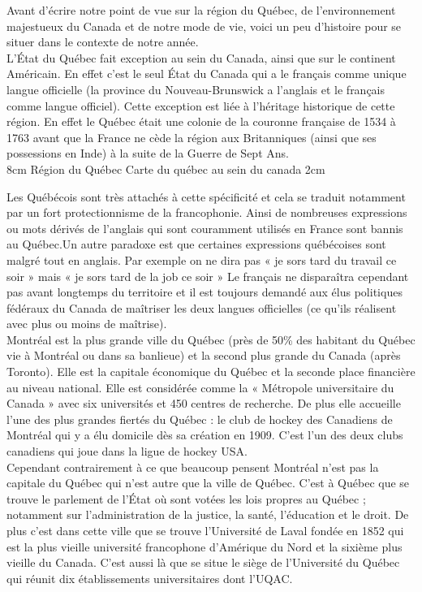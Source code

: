 Avant d'écrire notre point de vue sur la région du Québec, de l'environnement majestueux du Canada et de notre mode de vie, voici un peu d'histoire pour se situer dans le contexte de notre année.\\

L’État du Québec fait exception au sein du Canada, ainsi que sur le continent Américain. En effet c’est le seul État du Canada qui a le français comme unique langue officielle (la province du Nouveau-Brunswick a l’anglais et le français comme langue officiel). Cette exception est liée à l’héritage historique de cette région. En effet le Québec était une colonie de la couronne française de 1534 à 1763 avant que la France ne cède la région aux Britanniques (ainsi que ses possessions en Inde) à la suite de la Guerre de Sept Ans.\\

{8cm}
{Région du Québec}
{Carte du québec au sein du canada}
{2cm}

Les Québécois sont très attachés à cette spécificité et cela se traduit notamment par un fort protectionnisme de la francophonie. Ainsi de nombreuses expressions ou mots dérivés de l’anglais qui sont couramment utilisés en France sont bannis au Québec.Un autre paradoxe est que certaines expressions québécoises sont malgré tout en anglais. Par exemple on ne dira pas « je sors tard du travail ce soir » mais « je sors tard de la job ce soir » Le français ne disparaîtra cependant pas avant longtemps du territoire et il est toujours demandé aux élus politiques fédéraux du Canada de maîtriser les deux langues officielles (ce qu’ils réalisent avec plus ou moins de maîtrise).\\

Montréal est la plus grande ville du Québec (près de 50\% des habitant du Québec vie à Montréal ou dans sa banlieue) et la second plus grande du Canada (après Toronto). Elle est la capitale économique du Québec et la seconde place financière au niveau national. Elle est considérée comme la « Métropole universitaire du Canada » avec six universités et 450 centres de recherche. De plus elle accueille l’une des plus grandes fiertés du Québec : le club de hockey des Canadiens de Montréal qui y a élu domicile dès sa création en 1909. C’est l’un des deux clubs canadiens qui joue dans la ligue de hockey USA.\\

Cependant contrairement à ce que beaucoup pensent Montréal n’est pas la capitale du Québec qui n’est autre que la ville de Québec. C’est à Québec que se trouve le parlement de l’État où sont votées les lois propres au Québec ; notamment sur l'administration de la justice, la santé, l'éducation et le droit. De plus c’est dans cette ville que se trouve l’Université de Laval fondée en 1852 qui est la plus vieille université francophone d’Amérique du Nord et la sixième plus vieille du Canada.
C’est aussi là que se situe le siège de l’Université du Québec qui réunit dix établissements universitaires dont l’UQAC.\\

